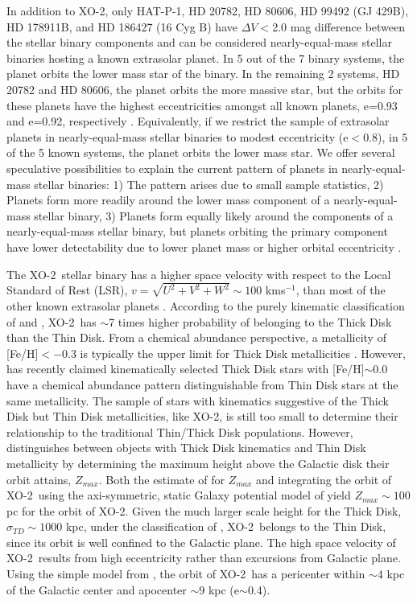 \documentclass{emulateapj}
\newcommand{\xon}{XO-2}
\begin{document}
In addition to \xon, only HAT-P-1, HD 20782, HD 80606, HD 99492 (GJ
429B), HD 178911B, and HD 186427 (16 Cyg B) have $\Delta V<$2.0 mag
difference between the stellar binary components \citep[][supplemented
by data from the SIMBAD database]{DES07} and can be considered
nearly-equal-mass stellar binaries hosting a known extrasolar planet.
In 5 out of the 7 binary systems, the planet orbits the lower mass
star of the binary.  In the remaining 2 systems, HD 20782 and HD
80606, the planet orbits the more massive star, but the orbits for
these planets have the highest eccentricities amongst all known
planets, e=0.93 and e=0.92, respectively \citep{BUT06}.  Equivalently,
if we restrict the sample of extrasolar planets in nearly-equal-mass
stellar binaries to modest eccentricity (e$<$0.8), in 5 of the 5 known
systems, the planet orbits the lower mass star.  We offer several
speculative possibilities to explain the current pattern of planets in
nearly-equal-mass stellar binaries: 1) The pattern arises due to small
sample statistics, 2) Planets form more readily around the lower mass
component of a nearly-equal-mass stellar binary, 3) Planets form
equally likely around the components of a nearly-equal-mass stellar
binary, but planets orbiting the primary component have lower
detectability due to lower planet mass or higher orbital eccentricity
\citep{CUM04}.

The \xon\ stellar binary has a higher space velocity with respect to
the Local Standard of Rest (LSR), $v=\sqrt{U^2+V^2+W^2}\sim 100$
kms$^{-1}$, than most of the other known extrasolar planets
\citep{SAN03,ECU07}.  According to the purely kinematic classification
of \citet{BEN03} and \citet{BEN06}, \xon\ has $\sim$7 times higher
probability of belonging to the Thick Disk than the Thin Disk.  From a
chemical abundance perspective, a metallicity of [Fe/H]$<-0.3$ is
typically the upper limit for Thick Disk metallicities
\citep{MIS04,RED06}.  However, \citet{BEN06} has recently claimed
kinematically selected Thick Disk stars with [Fe/H]$\sim 0.0$ have a
chemical abundance pattern distinguishable from Thin Disk stars at the
same metallicity.  The sample of stars with kinematics suggestive of
the Thick Disk but Thin Disk metallicities, like \xon, is still too
small to determine their relationship to the traditional Thin/Thick
Disk populations.  However, \citet{MIS04} distinguishes between objects with
Thick Disk kinematics and Thin Disk metallicity by determining the
maximum height above the Galactic disk their orbit attains, $Z_{max}$.
Both the estimate of \citet{BEN05} for $Z_{max}$ and integrating the
orbit of \xon\ using the axi-symmetric, static Galaxy potential model
of \citet{ALL91} yield $Z_{max}\sim 100$ pc for the orbit of \xon.  Given
the much larger scale height for the Thick Disk, $\sigma_{TD}\sim 1000$
kpc, under the classification of \citet{MIS04}, \xon\ belongs to the
Thin Disk, since its orbit is well confined to the Galactic plane.
The high space velocity of \xon\ results from high eccentricity rather
than excursions from Galactic plane.  Using the simple model from
\citet{ALL91}, the orbit of \xon\ has a pericenter within $\sim$4 kpc of the
Galactic center and apocenter $\sim$9 kpc (e$\sim$0.4).
\end{document}
